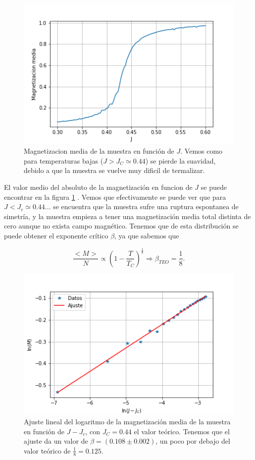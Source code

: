 \documentclass[%
 reprint,
 amsmath,amssymb,
 aps,
]{revtex4-1}
\begin{document}
\begin{figure}
  \includegraphics[width=1.0\columnwidth]{images/magnetization_vs_j.png}
  \caption{Magnetizacion media de la muestra en funci\'on de $J$. Vemos como
    para temperaturas bajas ($J > J_C \simeq 0.44$) se pierde la suavidad,
    debido a que la muestra se vuelve muy dificil de termalizar.}
  \label{magnetization_vs_j}
\end{figure}

El valor medio del absoluto de la magnetizaci\'on en funcion de $J$ se puede
encontrar en la figura \ref{magnetization_vs_j} . Vemos que efectivamente se
puede ver que para $J<J_c \simeq 0.44...$ se encuentra que la muestra sufre una
ruptura espontanea de simetr\'ia, y la muestra empieza a tener una
magnetizaci\'on media total distinta de cero aunque no exista campo magn\'etico.
Tenemos que de esta distribuci\'on se puede obtener el exponente cr\'itico
$\beta$, ya que sabemos que

$$\frac{<M>}{N} \propto (1 - \frac{T}{T_C})^\frac{1}{8} \Rightarrow
  \beta_{TEO} = \frac{1}{8}.$$

\begin{figure}
  \includegraphics[width=1.0\columnwidth]{images/ajuste_beta.png}
  \caption{Ajuste lineal del logaritmo de la magnetizaci\'on media de la
    muestra en funci\'on de $J - J_c$, con $J_C = 0.44$ el valor te\'orico.
    Tenemos que el ajuste da un valor de $\beta = (0.108 \pm 0.002)$, un poco
    por debajo del valor te\'orico de $\frac{1}{8} = 0.125$.}
  \label{ajuste_beta}
\end{figure}
\end{document}
